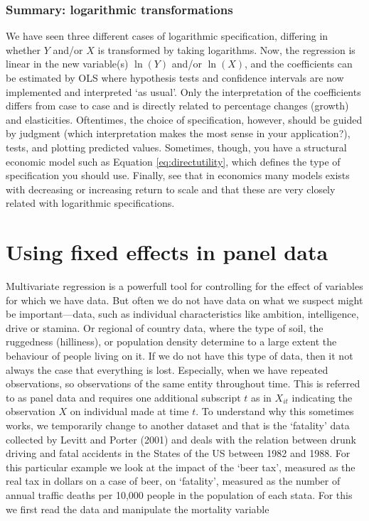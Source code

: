 \documentclass[
]{book}
\begin{document}
\hypertarget{summary-logarithmic-transformations}{%
\subsubsection{Summary: logarithmic transformations}\label{summary-logarithmic-transformations}}

We have seen three different cases of logarithmic specification, differing in whether \(Y\) and/or \(X\) is transformed by taking logarithms. Now, the regression is linear in the new variable(s) \(\ln(Y)\) and/or \(\ln(X)\), and the coefficients can be estimated by OLS where hypothesis tests and confidence intervals are now implemented and interpreted `as usual'. Only the interpretation of the coefficients differs from case to case and is directly related to percentage changes (growth) and elasticities. Oftentimes, the choice of specification, however, should be guided by judgment (which interpretation makes the most sense in your application?), tests, and plotting predicted values. Sometimes, though, you have a structural economic model such as Equation \eqref{eq:directutility}, which defines the type of specification you should use. Finally, see that in economics many models exists with decreasing or increasing return to scale and that these are very closely related with logarithmic specifications.

\hypertarget{sec:fixedeffects}{%
\section{Using fixed effects in panel data}\label{sec:fixedeffects}}

Multivariate regression is a powerfull tool for controlling for the effect of variables for which we have data. But often we do not have data on what we suspect might be important---data, such as individual characteristics like ambition, intelligence, drive or stamina. Or regional of country data, where the type of soil, the ruggedness (hilliness), or population density determine to a large extent the behaviour of people living on it. If we do not have this type of data, then it not always the case that everything is lost. Especially, when we have repeated observations, so observations of the same entity throughout time. This is referred to as panel data and requires one additional subscript \(t\) as in \(X_{it}\) indicating the observation \(X\) on individual made at time \(t\). To understand why this sometimes works, we temporarily change to another dataset and that is the `fatality' data collected by Levitt and Porter (2001) and deals with the relation between drunk driving and fatal accidents in the States of the US between 1982 and 1988. For this particular example we look at the impact of the `beer tax', measured as the real tax in dollars on a case of beer, on `fatality', measured as the number of annual traffic deaths per 10,000 people in the population of each stata. For this we first read the data and manipulate the mortality variable
\end{document}
